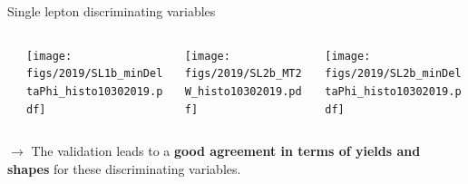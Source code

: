 \documentclass[9pt]{beamer}
\begin{document}
\begin{frame}{\alert{Single lepton} discriminating variables}
\begin{columns}
\begin{column}{0.05\textwidth}
		\end{column} \hfill
		\begin{column}{0.32\textwidth}
			\begin{center}
     			\texttt{[image: figs/2019/SL1b\_minDeltaPhi\_histo10302019.pdf]}
    		\end{center}		
		\end{column} \hfill
		\begin{column}{0.32\textwidth}
			\begin{center}
     			\texttt{[image: figs/2019/SL2b\_MT2W\_histo10302019.pdf]}
    		\end{center}		
		\end{column} \hfill
		\begin{column}{0.32\textwidth}
			\begin{center}
     			\texttt{[image: figs/2019/SL2b\_minDeltaPhi\_histo10302019.pdf]}
   			 \end{center}
		\end{column} \hfill
	\end{columns} \vfill
	\vspace{10pt}
	$\rightarrow$ The validation leads to a \textbf{good agreement in terms of yields and shapes} for these discriminating variables. \vfill \vspace{-10pt}
\end{frame}
\end{document}
